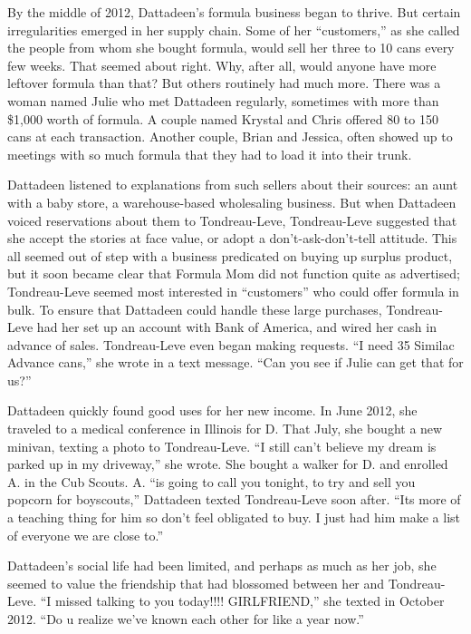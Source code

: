 By the middle of 2012, Dattadeen's formula business began to thrive. But
certain irregularities emerged in her supply chain. Some of her
``customers,'' as she called the people from whom she bought formula,
would sell her three to 10 cans every few weeks. That seemed about
right. Why, after all, would anyone have more leftover formula than
that? But others routinely had much more. There was a woman named Julie
who met Dattadeen regularly, sometimes with more than \$1,000 worth of
formula. A couple named Krystal and Chris offered 80 to 150 cans at each
transaction. Another couple, Brian and Jessica, often showed up to
meetings with so much formula that they had to load it into their trunk.

Dattadeen listened to explanations from such sellers about their
sources: an aunt with a baby store, a warehouse-based wholesaling
business. But when Dattadeen voiced reservations about them to
Tondreau-Leve, Tondreau-Leve suggested that she accept the stories at
face value, or adopt a don't-ask-don't-tell attitude. This all seemed
out of step with a business predicated on buying up surplus product, but
it soon became clear that Formula Mom did not function quite as
advertised; Tondreau-Leve seemed most interested in ``customers'' who
could offer formula in bulk. To ensure that Dattadeen could handle these
large purchases, Tondreau-Leve had her set up an account with Bank of
America, and wired her cash in advance of sales. Tondreau-Leve even
began making requests. ``I need 35 Similac Advance cans,'' she wrote in
a text message. ``Can you see if Julie can get that for us?''

Dattadeen quickly found good uses for her new income. In June 2012, she
traveled to a medical conference in Illinois for D. That July, she
bought a new minivan, texting a photo to Tondreau-Leve. ``I still can't
believe my dream is parked up in my driveway,'' she wrote. She bought a
walker for D. and enrolled A. in the Cub Scouts. A. ``is going to call
you tonight, to try and sell you popcorn for boyscouts,'' Dattadeen
texted Tondreau-Leve soon after. ``Its more of a teaching thing for him
so don't feel obligated to buy. I just had him make a list of everyone
we are close to.''

Dattadeen's social life had been limited, and perhaps as much as her
job, she seemed to value the friendship that had blossomed between her
and Tondreau-Leve. ``I missed talking to you today!!!! GIRLFRIEND,'' she
texted in October 2012. ``Do u realize we've known each other for like a
year now.''

